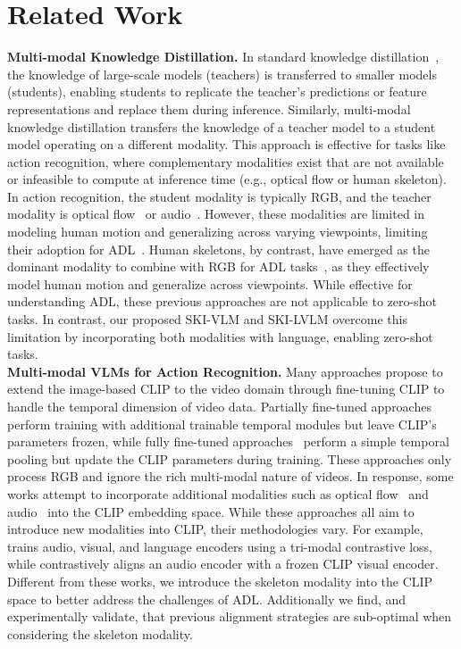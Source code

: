 \section{Related Work}
\noindent
\textbf{Multi-modal Knowledge Distillation.}
In standard knowledge distillation~\cite{knowledge_distillation_hinton2015}, the knowledge of large-scale models (teachers) is transferred to smaller models (students), enabling students to replicate the teacher’s predictions or feature representations and replace them during inference. Similarly, multi-modal knowledge distillation transfers the knowledge of a teacher model to a student model operating on a different modality. This approach is effective for tasks like action recognition, where complementary modalities exist that are not available or infeasible to compute at inference time (e.g., optical flow or human skeleton). In action recognition, the student modality is typically RGB, and the teacher modality is optical flow~\cite{gupta_crossmodaldistillation_cvpr16, mars} or audio~\cite{soundnet}. However, these modalities are limited in modeling human motion and generalizing across varying viewpoints, limiting their adoption for ADL~\cite{das2020vpn}. Human skeletons, by contrast, have emerged as the dominant modality to combine with RGB for ADL tasks~\cite{das2020vpn, vpn++, pivit}, as they effectively model human motion and generalize across viewpoints. While effective for understanding ADL, these previous approaches are not applicable to zero-shot tasks. In contrast, our proposed SKI-VLM and SKI-LVLM overcome this limitation by incorporating both modalities with language, enabling zero-shot tasks.\\
\textbf{Multi-modal VLMs for Action Recognition.}
Many approaches propose to extend the image-based CLIP to the video domain through fine-tuning CLIP to handle the temporal dimension of video data. Partially fine-tuned approaches
~\cite{yang2023_AIM_ICLR, XCLIP, st_adapter}
perform training with additional trainable temporal modules but leave CLIP's parameters frozen, while fully fine-tuned approaches~\cite{ActionCLIP, vificlip, FROSTER} perform a simple temporal pooling but update the CLIP parameters during training. These approaches only process RGB and ignore the rich multi-modal nature of videos. In response, some works attempt to incorporate additional modalities such as optical flow~\cite{qian2022_opticalflow_and_audioclip} and audio~\cite{Audioclip, clip4vla, Wav2CLIP} into the CLIP embedding space. While these approaches all aim to introduce new modalities into CLIP, their methodologies vary. For example, \cite{Audioclip} trains audio, visual, and language encoders using a tri-modal contrastive loss, while \cite{Wav2CLIP} contrastively aligns an audio encoder with a frozen CLIP visual encoder. Different from these works, we introduce the skeleton modality into the CLIP space to better address the challenges of ADL. Additionally we find, and experimentally validate, that previous alignment strategies are sub-optimal when considering the skeleton modality.

